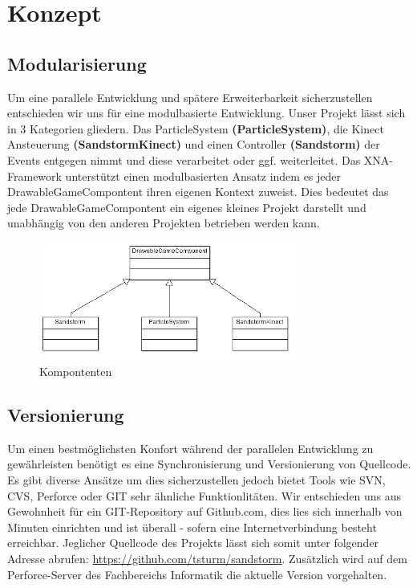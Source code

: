 \chapter{Konzept}
\begin{Spacing}{\mylinespace}

\section{Modularisierung}
Um eine parallele Entwicklung und spätere Erweiterbarkeit sicherzustellen entschieden wir uns für eine modulbasierte Entwicklung.
Unser Projekt lässt sich in 3 Kategorien gliedern. Das ParticleSystem \textbf{(ParticleSystem)}, die Kinect Ansteuerung \textbf{(SandstormKinect)} und einen Controller \textbf{(Sandstorm)} der Events entgegen nimmt und diese verarbeitet oder ggf. weiterleitet.
Das XNA-Framework unterstützt einen modulbasierten Ansatz indem es jeder DrawableGameCompontent ihren eigenen Kontext zuweist.
Dies bedeutet das jede DrawableGameCompontent ein eigenes kleines Projekt darstellt und unabhängig von den anderen Projekten betrieben werden kann.
\begin{figure}[h!]
	\centering
	\vspace*{20px}
	\includegraphics[width=320px]{graphics/DrawableGame.png}
	\caption{Kompontenten}
	\label{fig:singleColor}
\end{figure}

\section{Versionierung}
Um einen bestmöglichsten Konfort während der parallelen Entwicklung zu gewährleisten benötigt es eine Synchronisierung und Versionierung von Quellcode. Es gibt diverse Ansätze um dies sicherzustellen jedoch bietet Tools wie SVN, CVS, Perforce oder GIT sehr ähnliche Funktionlitäten. Wir entschieden uns aus Gewohnheit für ein GIT-Repository auf Github.com, dies lies sich innerhalb von Minuten einrichten und ist überall - sofern eine Internetverbindung besteht erreichbar. Jeglicher Quellcode des Projekts lässt sich somit unter folgender Adresse abrufen: \url{https://github.com/tsturm/sandstorm}. Zusätzlich wird auf dem Perforce-Server des Fachbereichs Informatik die aktuelle Version vorgehalten.

\end{Spacing}
\newpage
\clearpage
